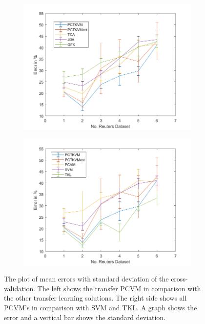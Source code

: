\begin{figure}[!]
	\centering
	\begin{subfigure}{.5\textwidth}
		\centering
		\includegraphics[width=1\linewidth]{figures/FiveTwoReutersTL.png}
		\caption{\label{FigErrorReuTL}}
	\end{subfigure}%
	\begin{subfigure}{.5\textwidth}
		\centering
		\includegraphics[width=1\linewidth]{figures/PerformanceReuters.png}
		\caption{\label{FigErrorReuO}}
	\end{subfigure}
	\caption[Plot of mean Error and standard Deviation on Reuters Dataset]{The plot of mean errors with standard deviation of the cross-validation. The left shows the transfer \acs{PCVM} in comparison with the other transfer learning solutions. The right side shows all \acs{PCVM}'s in comparison with \acs{SVM} and \acs{TKL}. A graph shows the error and a vertical bar shows the standard deviation. \label{FigErrorReutersDatasetsB}}
\end{figure}

